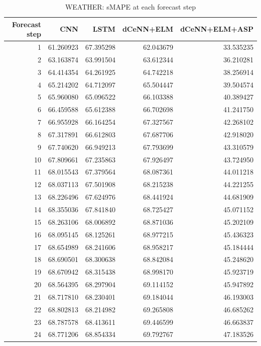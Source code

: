\begin{table}
\caption{WEATHER: sMAPE at each forecast step}
\begin{tabular}{rrrrr}
\toprule
Forecast step & CNN & LSTM & dCeNN+ELM & dCeNN+ELM+ASP \\
\midrule
1 & 61.260923 & 67.395298 & 62.043679 & 33.535235 \\
2 & 63.163874 & 63.991504 & 63.612344 & 36.210281 \\
3 & 64.414354 & 64.261925 & 64.742218 & 38.256914 \\
4 & 65.214202 & 64.712097 & 65.504447 & 39.504574 \\
5 & 65.960080 & 65.096522 & 66.103388 & 40.389427 \\
6 & 66.459588 & 65.612388 & 66.702698 & 41.241750 \\
7 & 66.955928 & 66.164254 & 67.327567 & 42.268102 \\
8 & 67.317891 & 66.612803 & 67.687706 & 42.918020 \\
9 & 67.740620 & 66.949213 & 67.793699 & 43.310579 \\
10 & 67.809661 & 67.235863 & 67.926497 & 43.724950 \\
11 & 68.015543 & 67.379564 & 68.087361 & 44.011218 \\
12 & 68.037113 & 67.501908 & 68.215238 & 44.221255 \\
13 & 68.226496 & 67.624976 & 68.441924 & 44.681909 \\
14 & 68.355036 & 67.841840 & 68.725427 & 45.071152 \\
15 & 68.263106 & 68.006892 & 68.871036 & 45.202109 \\
16 & 68.095145 & 68.125261 & 68.977215 & 45.436323 \\
17 & 68.654989 & 68.241606 & 68.958217 & 45.184444 \\
18 & 68.690501 & 68.300638 & 68.842084 & 45.248620 \\
19 & 68.670942 & 68.315438 & 68.998170 & 45.923719 \\
20 & 68.564395 & 68.297904 & 69.114152 & 45.947892 \\
21 & 68.717810 & 68.230401 & 69.184044 & 46.193003 \\
22 & 68.802813 & 68.214982 & 69.265808 & 46.685262 \\
23 & 68.787578 & 68.413611 & 69.446599 & 46.663837 \\
24 & 68.771206 & 68.854334 & 69.792767 & 47.183526 \\
\bottomrule
\end{tabular}
\end{table}
